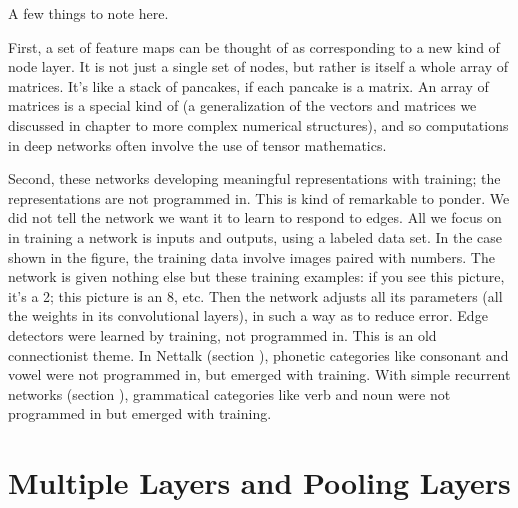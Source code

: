 
A few things to note here.

First, a set of feature maps can be thought of as corresponding to a new kind of node layer. It is not just a  single set of nodes, but rather is itself a whole array of matrices. It's like a stack of pancakes, if each pancake is a matrix.  An array of matrices is a special kind of  (a generalization of the vectors and matrices we discussed in chapter  to more complex numerical structures), and so computations in deep networks often involve the use of tensor mathematics.

Second, these networks developing meaningful representations with training; the representations are not programmed in. This is kind of remarkable to ponder. We did not tell the network we want it to learn to respond to edges. All we focus on in training a network is inputs and outputs, using a labeled data set.  In the case shown in the figure, the training data involve images paired with numbers. The network is given nothing else but these training examples: if you see this picture, it's a 2; this picture is an 8, etc. Then the network adjusts all its parameters (all the weights in its convolutional layers), in such a way as to reduce error.  Edge detectors were learned by training, not programmed in. This is an old connectionist theme. In Nettalk (section ), phonetic categories like consonant and vowel were not programmed in, but emerged with training. With simple recurrent networks  (section ), grammatical categories like verb and noun were not programmed in but  emerged with training.

\section{Multiple Layers and Pooling Layers}



